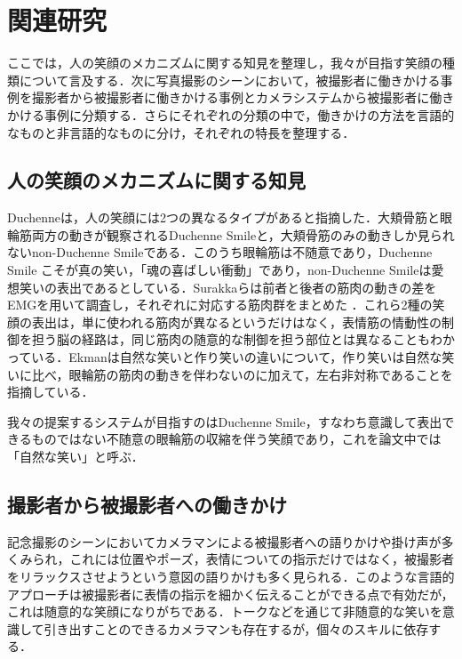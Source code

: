\documentclass[submit,techreq]{ec2014}
\begin{document}
\section{関連研究}

ここでは，人の笑顔のメカニズムに関する知見を整理し，我々が目指す笑顔の種類について言及する．次に写真撮影のシーンにおいて，被撮影者に働きかける事例を撮影者から被撮影者に働きかける事例とカメラシステムから被撮影者に働きかける事例に分類する．さらにそれぞれの分類の中で，働きかけの方法を言語的なものと非言語的なものに分け，それぞれの特長を整理する．

\subsection{人の笑顔のメカニズムに関する知見}

Duchenneは，人の笑顔には2つの異なるタイプがあると指摘した．大頬骨筋と眼輪筋両方の動きが観察されるDuchenne Smileと，大頬骨筋のみの動きしか見られないnon-Duchenne Smileである\cite{de1990mechanism}．このうち眼輪筋は不随意であり，Duchenne Smile こそが真の笑い，「魂の喜ばしい衝動」であり，non-Duchenne Smileは愛想笑いの表出であるとしている．Surakkaらは前者と後者の筋肉の動きの差をEMGを用いて調査し，それぞれに対応する筋肉群をまとめた \cite{surakka1998facial}．これら2種の笑顔の表出は，単に使われる筋肉が異なるというだけはなく，表情筋の情動性の制御を担う脳の経路は，同じ筋肉の随意的な制御を担う部位とは異なることもわかっている\cite{tanaka201007}．Ekmanは自然な笑いと作り笑いの違いについて，作り笑いは自然な笑いに比べ，眼輪筋の筋肉の動きを伴わないのに加えて，左右非対称であることを指摘している\cite{ekman2009telling}．

我々の提案するシステムが目指すのはDuchenne Smile，すなわち意識して表出できるものではない不随意の眼輪筋の収縮を伴う笑顔であり，これを論文中では「自然な笑い」と呼ぶ．

\subsection{撮影者から被撮影者への働きかけ}

記念撮影のシーンにおいてカメラマンによる被撮影者への語りかけや掛け声が多くみられ，これには位置やポーズ，表情についての指示だけではなく，被撮影者をリラックスさせようという意図の語りかけも多く見られる．このような言語的アプローチは被撮影者に表情の指示を細かく伝えることができる点で有効だが，これは随意的な笑顔になりがちである．トークなどを通じて非随意的な笑いを意識して引き出すことのできるカメラマンも存在するが，個々のスキルに依存する．
\end{document}

